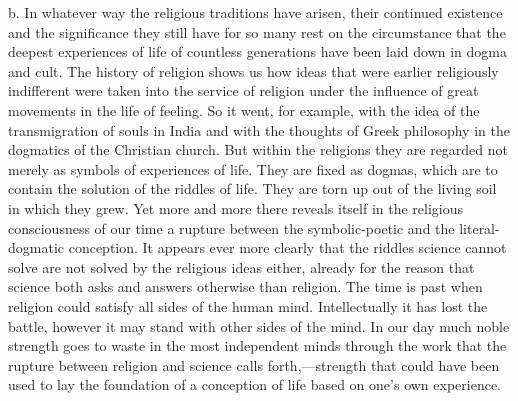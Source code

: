 \documentclass[12pt]{article}
\newcommand{\opage}[1]{\marginnote{\footnotesize\textit{[#1]}}}
\begin{document}
b. In whatever way the religious traditions have arisen, their continued
existence and the significance they still have for so many rest on the
circumstance that the deepest experiences of life of countless generations have
been laid down in dogma and cult. The history of religion shows us how ideas
that were earlier religiously indifferent were taken into the service of
religion under the influence of great movements in the life of feeling. So it
went, for example, with the idea of the transmigration of souls in India and with
the thoughts of Greek philosophy in the dogmatics of the Christian church. But
within the religions they are regarded not merely as symbols of experiences of
life. They are fixed as dogmas, which are to contain the solution of the riddles
of life. They are torn up out of the living soil in which they grew. Yet more and
more there reveals itself in the religious consciousness of our time a rupture
between the symbolic-poetic and the literal-dogmatic conception. It appears ever
more clearly that the riddles science cannot solve are not solved by the
religious
\opage{66}%
ideas either, already for the reason that science both asks and answers
otherwise than religion. The time is past when religion could satisfy all sides
of the human mind. Intellectually it has lost the battle, however it may stand
with other sides of the mind. In our day much noble strength goes to waste in the
most independent minds through the work that the rupture between religion and
science calls forth,---strength that could have been used to lay the foundation
of a conception of life based on one's own experience.
\end{document}
